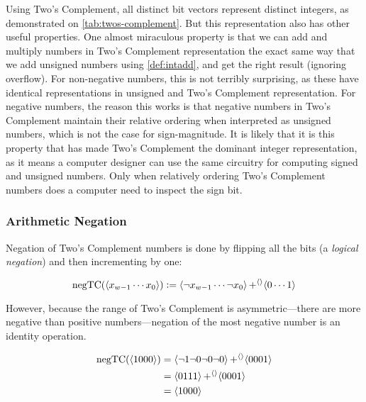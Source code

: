 Using Two's Complement, all distinct bit vectors represent distinct
integers, as demonstrated on \cref{tab:twos-complement}.  But this
representation also has other useful properties.  One almost
miraculous property is that we can add and multiply numbers in Two's
Complement representation the exact same way that we add unsigned
numbers using \cref{def:intadd}, and get the right result (ignoring
overflow).  For non-negative numbers, this is not terribly surprising,
as these have identical representations in unsigned and Two's
Complement representation.  For negative numbers, the reason this
works is that negative numbers in Two's Complement maintain their
relative ordering when interpreted as unsigned numbers, which is not
the case for sign-magnitude.  It is likely that it is this property
that has made Two's Complement the dominant integer representation, as
it means a computer designer can use the same circuitry for computing
signed and unsigned numbers.  Only when relatively ordering Two's
Complement numbers does a computer need to inspect the sign bit.

\subsubsection{Arithmetic Negation}

Negation of Two's Complement numbers is done by flipping all the bits
(a \emph{logical negation}) and then incrementing by one:

\begin{definition}
  \[
    \mathrm{negTC}(\langle x_{w-1}\cdots{}x_{0} \rangle) \vcentcolon= \langle \neg{}x_{w-1}\cdots{}\neg{}x_{0} \rangle \operatorname{+^{\langle\rangle}} \langle 0\cdots{}1 \rangle
  \]
\end{definition}

However, because the range of Two's Complement is asymmetric---there
are more negative than positive numbers---negation of the most
negative number is an identity operation.

\begin{example}
  \begin{align}
    \mathrm{negTC}(\langle 1000 \rangle)
    &= \langle \neg 1 \neg 0 \neg 0 \neg 0 \rangle \operatorname{+^{\langle\rangle}} \langle 0001 \rangle \\
    &= \langle 0 1 1 1 \rangle \operatorname{+^{\langle\rangle}} \langle 0001 \rangle \\
    &= \langle 1 0 0 0 \rangle
  \end{align}
\end{example}

